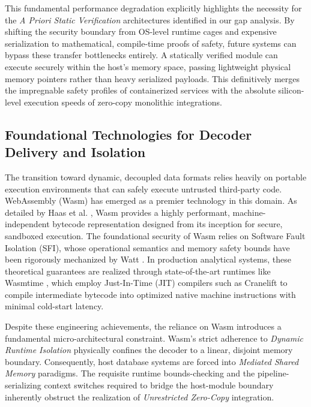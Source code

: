 \documentclass[onecolumn]{IEEEtran}
\numberwithin{equation}{section}
\theoremstyle{definition}
\theoremstyle{remark}
\begin{document}
This fundamental performance degradation explicitly highlights the necessity for the \textit{A Priori Static Verification} architectures identified in our gap analysis. By shifting the security boundary from OS-level runtime cages and expensive serialization to mathematical, compile-time proofs of safety, future systems can bypass these transfer bottlenecks entirely. A statically verified module can execute securely within the host's memory space, passing lightweight physical memory pointers rather than heavy serialized payloads. This definitively merges the impregnable safety profiles of containerized services with the absolute silicon-level execution speeds of zero-copy monolithic integrations.

\subsection{Foundational Technologies for Decoder Delivery and Isolation}

The transition toward dynamic, decoupled data formats relies heavily on portable execution environments that can safely execute untrusted third-party code. WebAssembly (Wasm) has emerged as a premier technology in this domain. As detailed by Haas et al. \cite{haas2017bringing}, Wasm provides a highly performant, machine-independent bytecode representation designed from its inception for secure, sandboxed execution. The foundational security of Wasm relies on Software Fault Isolation (SFI), whose operational semantics and memory safety bounds have been rigorously mechanized by Watt \cite{watt2018mechanising}. In production analytical systems, these theoretical guarantees are realized through state-of-the-art runtimes like Wasmtime \cite{bytecode2019wasmtime}, which employ Just-In-Time (JIT) compilers such as Cranelift \cite{bytecode2016cranelift} to compile intermediate bytecode into optimized native machine instructions with minimal cold-start latency. 

Despite these engineering achievements, the reliance on Wasm introduces a fundamental micro-architectural constraint. Wasm's strict adherence to \textit{Dynamic Runtime Isolation} physically confines the decoder to a linear, disjoint memory boundary. Consequently, host database systems are forced into \textit{Mediated Shared Memory} paradigms. The requisite runtime bounds-checking and the pipeline-serializing context switches required to bridge the host-module boundary inherently obstruct the realization of \textit{Unrestricted Zero-Copy} integration.
\end{document}
